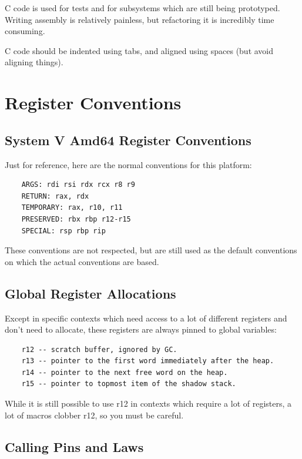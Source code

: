 C code is used for tests and for subsystems which are still being
prototyped.  Writing assembly is relatively painless, but refactoring
it is incredibly time consuming.

C code should be indented using tabs, and aligned using spaces (but
avoid aligning things).

\section{Register Conventions}

\subsection{System V Amd64 Register Conventions}

Just for reference, here are the normal conventions for this platform:

\begin{verbatim}
    ARGS: rdi rsi rdx rcx r8 r9
    RETURN: rax, rdx
    TEMPORARY: rax, r10, r11
    PRESERVED: rbx rbp r12-r15
    SPECIAL: rsp rbp rip
\end{verbatim}

These conventions are not respected, but are still used as the default
conventions on which the actual conventions are based.

\subsection{Global Register Allocations}

Except in specific contexts which need access to a lot of different
registers and don't need to allocate, these registers are always pinned
to global variables:

\begin{verbatim}
    r12 -- scratch buffer, ignored by GC.
    r13 -- pointer to the first word immediately after the heap.
    r14 -- pointer to the next free word on the heap.
    r15 -- pointer to topmost item of the shadow stack.
\end{verbatim}

While it is still possible to use r12 in contexts which require a lot
of registers, a lot of macros clobber r12, so you must be careful.

\subsection{Calling Pins and Laws}

